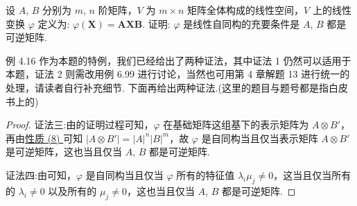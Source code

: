 \documentclass[../../main.tex]{subfiles}
\begin{document}
\begin{example}
设 $A$, $B$ 分别为 $m$, $n$ 阶矩阵，$V$ 为 $m\times n$ 矩阵全体构成的线性空间，$V$ 上的线性变换 $\varphi$ 定义为: $\varphi(\boldsymbol{X}) = \boldsymbol{A}\boldsymbol{X}\boldsymbol{B}$. 证明: $\varphi$ 是线性自同构的充要条件是 $A$, $B$ 都是可逆矩阵.
\end{example}
\begin{remark}
例 4.16 作为本题的特例，我们已经给出了两种证法，其中证法 1 仍然可以适用于本题，证法 2 则需改用例 6.99 进行讨论，当然也可用第 4 章解题 13 进行统一的处理，请读者自行补充细节. 下面再给出两种证法.(这里的题目与题号都是指白皮书上的)
\end{remark}
\begin{proof}
{\color{blue}证法三:}由的证明过程可知，$\varphi$ 在基础矩阵这组基下的表示矩阵为 $A\otimes B'$，再由\hyperref[矩阵的Kronecker积的基本性质(8)]{性质 (8) }可知 $|A\otimes B'| = |A|^n|B|^m$，故 $\varphi$ 是自同构当且仅当表示矩阵 $A\otimes B'$ 是可逆矩阵，这也当且仅当 $A$, $B$ 都是可逆矩阵.

{\color{blue}证法四:}由可知，$\varphi$ 是自同构当且仅当 $\varphi$ 所有的特征值 $\lambda_i\mu_j\neq 0$，这当且仅当所有的 $\lambda_i\neq 0$ 以及所有的 $\mu_j\neq 0$，这也当且仅当 $A$, $B$ 都是可逆矩阵.

\end{proof}
\end{document}
